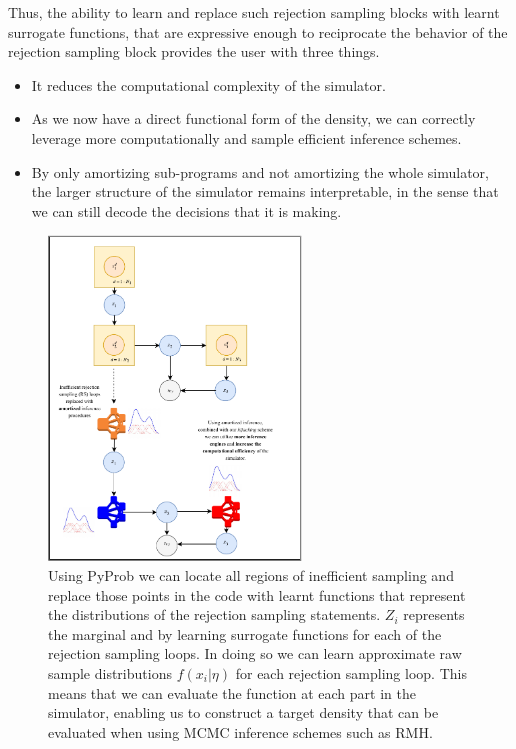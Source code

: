 \documentclass{article}
\begin{document}
Thus, the ability to learn and replace such rejection
sampling blocks with learnt surrogate functions, that are expressive enough to 
reciprocate the behavior of the rejection sampling block provides the user with three things. 
\begin{itemize}
  \item It reduces the computational complexity of the simulator.  
  \item As we now have a direct functional form of the density, we can correctly leverage more computationally and sample efficient inference schemes. 
  \item By only amortizing sub-programs and not amortizing the whole simulator, the larger structure of the simulator remains interpretable, in the sense that we can 
  still decode the decisions that it is making.  
\end{itemize}

\begin{figure}
  \includegraphics[width=0.6\textwidth, height=0.6\textheight,keepaspectratio]{amoritized_rejection.pdf}
    \caption{Using PyProb we can locate all regions of inefficient sampling 
    and replace those points in the code with learnt functions that represent
    the distributions of the rejection sampling statements. $Z_{i}$ represents the marginal and 
    by learning surrogate functions for each of the rejection sampling loops.
    In doing so we can learn approximate raw sample distributions $f(x_{i} | \eta)$ for each
    rejection sampling loop. This means that we can evaluate the function at each part in the simulator, enabling
    us to construct a target density that can be evaluated when using MCMC inference schemes such as RMH.}
    \label{fig:amortized_sampling}
\end{figure}
\end{document}
